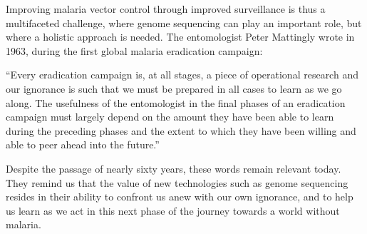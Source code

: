 \begin{refsection}
Improving malaria vector control through improved surveillance is thus a multifaceted challenge, where genome sequencing can play an important role, but where a holistic approach is needed.
%
The entomologist Peter Mattingly wrote in 1963, during the first global malaria eradication campaign:


\begin{displayquote}
``Every eradication campaign is, at all stages, a piece of operational research and our ignorance is such that we must be prepared in all cases to learn as we go along. The usefulness of the entomologist in the final phases of an eradication campaign must largely depend on the amount they have been able to learn during the preceding phases and the extent to which they have been willing and able to peer ahead into the future.''
\end{displayquote}


Despite the passage of nearly sixty years, these words remain relevant today.
%
They remind us that the value of new technologies such as genome sequencing resides in their ability to confront us anew with our own ignorance, and to help us learn as we act in this next phase of the journey towards a world without malaria.


\printbibliography[
heading=subbibintoc,
title={References}
]


\end{refsection}
